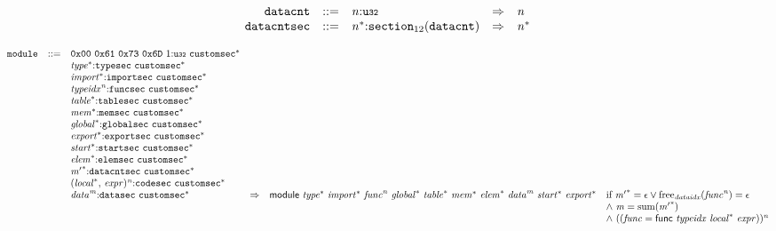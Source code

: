 \vspace{1ex}

$$
\begin{array}{@{}l@{}rrlll@{}l@{}}
& {\mathtt{datacnt}} &::=& {\mathit{n}}{:}{\mathtt{u{\scriptstyle32}}} &\Rightarrow& {\mathit{n}} \\
& {\mathtt{datacntsec}} &::=& {{\mathit{n}}^\ast}{:}{{\mathtt{section}}}_{12}({\mathtt{datacnt}}) &\Rightarrow& {{\mathit{n}}^\ast} \\
\end{array}
$$

\vspace{1ex}

$$
\begin{array}{@{}l@{}rrlll@{}l@{}}
& {\mathtt{module}} &::=& \mathtt{0x00}~\mathtt{0x61}~\mathtt{0x73}~\mathtt{0x6D}~1{:}{\mathtt{u{\scriptstyle32}}}~{{\mathtt{customsec}}^\ast} \\ &&&{{\mathit{type}}^\ast}{:}{\mathtt{typesec}}~{{\mathtt{customsec}}^\ast} \\ &&&{{\mathit{import}}^\ast}{:}{\mathtt{importsec}}~{{\mathtt{customsec}}^\ast} \\ &&&{{\mathit{typeidx}}^{{\mathit{n}}}}{:}{\mathtt{funcsec}}~{{\mathtt{customsec}}^\ast} \\ &&&{{\mathit{table}}^\ast}{:}{\mathtt{tablesec}}~{{\mathtt{customsec}}^\ast} \\ &&&{{\mathit{mem}}^\ast}{:}{\mathtt{memsec}}~{{\mathtt{customsec}}^\ast} \\ &&&{{\mathit{global}}^\ast}{:}{\mathtt{globalsec}}~{{\mathtt{customsec}}^\ast} \\ &&&{{\mathit{export}}^\ast}{:}{\mathtt{exportsec}}~{{\mathtt{customsec}}^\ast} \\ &&&{{\mathit{start}}^\ast}{:}{\mathtt{startsec}}~{{\mathtt{customsec}}^\ast} \\ &&&{{\mathit{elem}}^\ast}{:}{\mathtt{elemsec}}~{{\mathtt{customsec}}^\ast} \\ &&&{{\mathit{m}'}^\ast}{:}{\mathtt{datacntsec}}~{{\mathtt{customsec}}^\ast} \\ &&&{({{\mathit{local}}^\ast},\, {\mathit{expr}})^{{\mathit{n}}}}{:}{\mathtt{codesec}}~{{\mathtt{customsec}}^\ast} \\ &&&{{\mathit{data}}^{{\mathit{m}}}}{:}{\mathtt{datasec}}~{{\mathtt{customsec}}^\ast} &\Rightarrow& \mathsf{module}~{{\mathit{type}}^\ast}~{{\mathit{import}}^\ast}~{{\mathit{func}}^{{\mathit{n}}}}~{{\mathit{global}}^\ast}~{{\mathit{table}}^\ast}~{{\mathit{mem}}^\ast}~{{\mathit{elem}}^\ast}~{{\mathit{data}}^{{\mathit{m}}}}~{{\mathit{start}}^\ast}~{{\mathit{export}}^\ast} &\quad
  \mbox{if}~{{\mathit{m}'}^\ast} = \epsilon \lor {\mathrm{free}}_{{\mathit{dataidx}}}({{\mathit{func}}^{{\mathit{n}}}}) = \epsilon \\
 &&&&&&\quad {\land}~{\mathit{m}} = {\mathrm{sum}}({{\mathit{m}'}^\ast}) \\
 &&&&&&\quad {\land}~(({\mathit{func}} = \mathsf{func}~{\mathit{typeidx}}~{{\mathit{local}}^\ast}~{\mathit{expr}}))^{{\mathit{n}}} \\
\end{array}
$$

